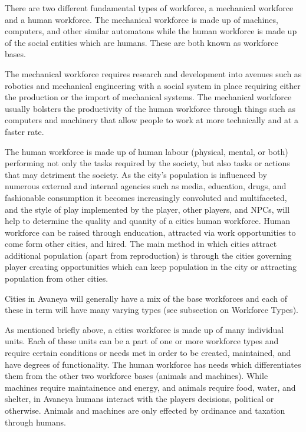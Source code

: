 There are two different fundamental types of workforce, a mechanical workforce and a human workforce. The mechanical workforce is made up of machines, computers, and other similar automatons while the human workforce is made up of the social entities which are humans. These are both known as workforce bases. 

The mechanical workforce requires research and development into avenues such as robotics and mechanical engineering with a social system in place requiring either the production or the import of mechanical systems. The mechanical workforce usually bolsters the productivity of the human workforce through things such as computers and machinery that allow people to work at more technically and at a faster rate.  

The human workforce is made up of human labour (physical, mental, or both) performing not only the tasks required by the society, but also tasks or actions that may detriment the society. As the city's population is influenced by numerous external and internal agencies such as media, education, drugs, and fashionable consumption it becomes increasingly convoluted and multifaceted, and the style of play implemented by the player, other players, and NPCs, will help to determine the quality and quanity of a cities human workforce. Human workforce can be raised through enducation, attracted via work opportunities to come form other cities, and hired. The main method in which cities attract additional population (apart from reproduction) is through the cities governing player creating opportunities which can keep population in the city or attracting population from other cities.

Cities in Avaneya will generally have a mix of the base workforces and each of these in term will have many varying types (see subsection on Workforce Types). 
 


As mentioned briefly above, a cities workforce is made up of many individual units. Each of these units can be a part of one or more workforce types and require certain conditions or needs met in order to be created, maintained, and have degrees of functionality. The human workforce has needs which differentiates them from the other two workforce bases (animals and machines). While machines require maintainence and energy, and animals require food, water, and shelter, in Avaneya humans interact with the players decisions, political or otherwise. Animals and machines are only effected by ordinance and taxation through humans. 

